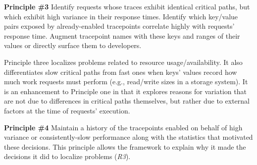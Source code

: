 



\noindent\textbf{Principle \#3} Identify requests whose traces exhibit
identical critical paths, but which exhibit high variance in their
response times.  Identify which key/value pairs exposed by
already-enabled tracepoints correlate highly with requests' response
time.  Augment tracepoint names with these keys and ranges of their
values or directly surface them to developers.

Principle three localizes problems related to resource
usage/availability.  It also differentiates slow critical paths from
fast ones when keys' values record how much work requests must perform
(e.g., read/write sizes in a storage system).  It is an enhancement to
Principle one in that it explores reasons for variation that are not
due to differences in critical paths themselves, but rather due to
external factors at the time of requests' execution.



\noindent\textbf{Principle \#4} Maintain a history of the tracepoints
enabled on behalf of high variance or consistently-slow performance
along with the statistics that motivated these decisions.  This
principle allows the framework to explain why it made the decisions it
did to localize problems (\textit{R3}).


